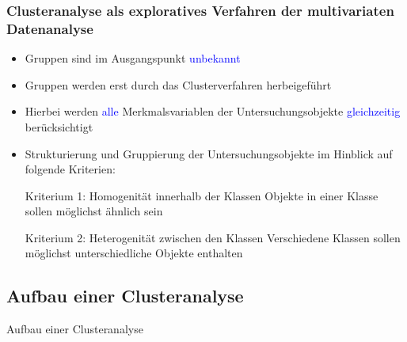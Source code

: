 \documentclass{beamer}
\begin{document}
\begin{frame}
 \frametitle{Clusteranalyse als exploratives Verfahren der multivariaten Datenanalyse}
 \begin{itemize}

  \item Gruppen sind im Ausgangspunkt \textcolor{blue}{unbekannt}

  \item Gruppen werden erst durch das Clusterverfahren herbeigeführt

  \item Hierbei werden \textcolor{blue}{alle} Merkmalsvariablen der Untersuchungsobjekte \textcolor{blue}{gleichzeitig} berücksichtigt

  \item Strukturierung und Gruppierung der Untersuchungsobjekte im Hinblick auf folgende Kriterien:

  \begin{block}{Kriterium 1: Homogenität innerhalb der Klassen}
   Objekte in einer Klasse sollen möglichst ähnlich sein
  \end{block}
 
  \begin{block}{Kriterium 2: Heterogenität zwischen den Klassen}
   Verschiedene Klassen sollen möglichst unterschiedliche Objekte enthalten
  \end{block}

 \end{itemize}
\end{frame}

\subsection{Aufbau einer Clusteranalyse}

\begin{frame}
 \centerline{Aufbau einer Clusteranalyse}
\end{frame}
\end{document}

